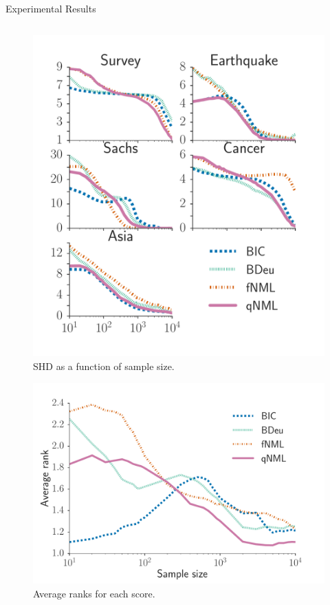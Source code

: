 \documentclass[final]{beamer}
\begin{document}
\begin{frame}{}
\begin{block}{Experimental Results}
\begin{columns}[T]
\begin{column}{0.4\textwidth}
\begin{minipage}{0.35\textwidth}
	  \begin{figure}[h]
		\includegraphics[width=\columnwidth]{shd_all.pdf}
		\caption{SHD as a function of sample size.}
		\label{fig:all_shd}
		\end{figure}
	  \end{minipage}
	  \begin{minipage}{0.33\textwidth}
	  \begin{figure}[h]
		\includegraphics[width=\columnwidth]{shd_rank_all.pdf}
		\caption{Average ranks for each score.}
		\end{figure}
		

\end{minipage}
\end{column}
\end{columns}
\end{block}
\end{frame}
\end{document}
